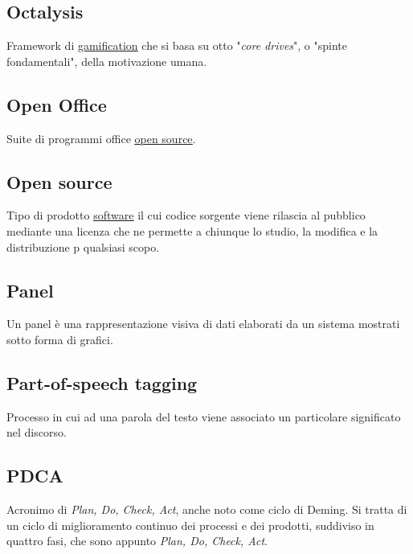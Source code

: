 	\subsection{Octalysis}
	\label{sec:octalysis}
	Framework di \underline{\hyperref[sec:gamification]{gamification}} che si basa su otto "\emph{core drives}", o "spinte fondamentali", della motivazione umana.

		\subsection{Open Office}
		\label{sec:openoffice}
		Suite di programmi office \underline{\hyperref[sec:opensource]{open source}}.

		\subsection{Open source}
		\label{sec:opensource}
		Tipo di prodotto \underline{\hyperref[sec:prodottosoftware]{software}} il cui codice sorgente viene rilascia	al pubblico mediante una licenza che ne permette a chiunque lo studio, la modifica e la distribuzione p	qualsiasi scopo.
		\newpage


	\subsection{Panel}
	\label{sec:panel}
	Un panel è una rappresentazione visiva di dati elaborati da un sistema mostrati sotto forma di grafici.

	\subsection{Part-of-speech tagging}
	\label{sec:post}
	Processo in cui ad una parola del testo viene associato un particolare significato nel discorso.


	\subsection{PDCA}
	\label{sec:pdca}
	Acronimo di \emph{Plan, Do, Check, Act}, anche noto come ciclo di Deming. Si tratta di un ciclo di miglioramento continuo dei processi e dei prodotti, suddiviso in quattro fasi, che sono appunto \emph{Plan, Do, Check, Act}.

